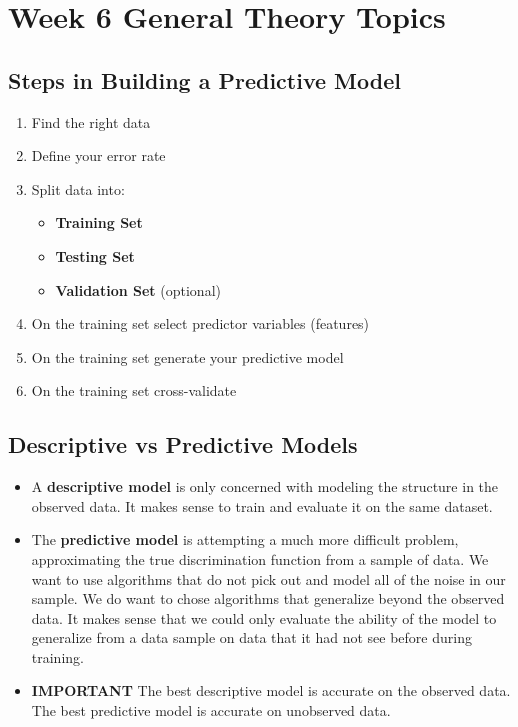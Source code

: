 \documentclass[a4paper,12pt]{article}
\begin{document}
\Large
\tableofcontents
\newpage
\section{Week 6 General Theory Topics}


\subsection{Steps in Building a Predictive Model}
\begin{enumerate}
\item Find the right data
\item Define your error rate
\item Split data into:
\begin{itemize}
\item \textbf{Training Set}
\item \textbf{Testing Set}
\item \textbf{Validation Set} (optional)
\end{itemize}
\item On the training set select predictor variables (features)
\item On the training set generate your predictive model
\item On the training set cross-validate

\end{enumerate}
\subsection{Descriptive vs Predictive Models}

\begin{itemize}
	\item A \textbf{descriptive model} is only concerned with modeling the structure in the observed data. It makes sense to train and evaluate it on the same dataset.
	
	\item The \textbf{predictive model} is attempting a much more difficult problem, approximating the true discrimination function from a sample of data. We want to use algorithms that do not pick out and model all of the noise in our sample. We do want to chose algorithms that generalize beyond the observed data. It makes sense that we could only evaluate the ability of the model to generalize from a data sample on data that it had not see before during training.
	
	\item \textbf{IMPORTANT} The best descriptive model is accurate on the observed data. The best predictive model is accurate on unobserved data.
\end{itemize}
\end{document}
